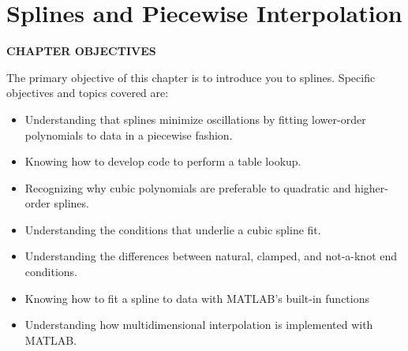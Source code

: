 \documentclass[../main.tex]{subfiles}
\begin{document}
\chapter{Splines and Piecewise Interpolation}\label{chap:chap18}

\begin{center}
    \Large{\textbf{CHAPTER OBJECTIVES}}
\end{center}
The primary objective of this chapter is to introduce you to splines. Specific objectives
and topics covered are:

\begin{itemize}
    \item Understanding that splines minimize oscillations by fitting lower-order
    polynomials to data in a piecewise fashion.
    \item Knowing how to develop code to perform a table lookup.
    \item Recognizing why cubic polynomials are preferable to quadratic and higher-order
    splines.
    \item Understanding the conditions that underlie a cubic spline fit.
    \item Understanding the differences between natural, clamped, and not-a-knot end
    conditions.
    \item Knowing how to fit a spline to data with MATLAB's built-in functions
    \item Understanding how multidimensional interpolation is implemented with MATLAB.
\end{itemize}
\vspace{2cm}
\end{document}
